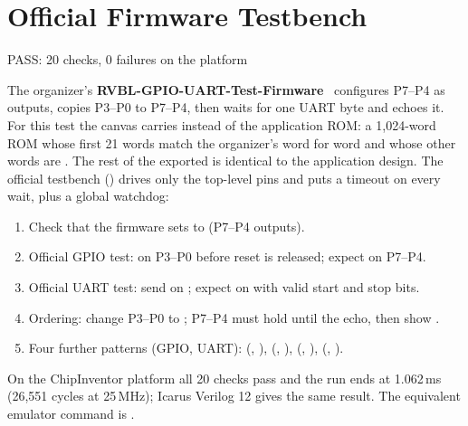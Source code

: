 \section{Official Firmware Testbench}\label{sec:official}
  {PASS: 20 checks, 0 failures on the platform}
  {}

The organizer's \textbf{RVBL-GPIO-UART-Test-Firmware}~\cite{repos} configures P7–P4 as outputs, copies P3–P0 to P7–P4, then waits for one UART byte and echoes it. For this test the canvas carries  instead of the application ROM: a 1,024-word ROM whose first 21 words match the organizer's  word for word and whose other words are . The rest of the exported  is identical to the application design. The official testbench () drives only the top-level pins and puts a timeout on every wait, plus a global watchdog:
\begin{enumerate}
  \item Check that the firmware sets  to  (P7–P4 outputs).
  \item Official GPIO test:  on P3–P0 before reset is released; expect  on P7–P4.
  \item Official UART test: send  on ; expect  on  with valid start and stop bits.
  \item Ordering: change P3–P0 to ; P7–P4 must hold  until the  echo, then show .
  \item Four further patterns (GPIO, UART): (, ), (, ), (, ), (, ).
\end{enumerate}
On the ChipInventor platform all 20 checks pass and the run ends at 1.062\,ms (26,551 cycles at 25\,MHz); Icarus Verilog 12 gives the same result. The equivalent emulator command is .

